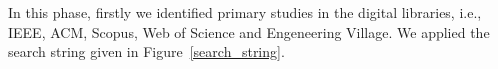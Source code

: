 %

In this phase, firstly we identified primary studies in the digital libraries, i.e., IEEE, ACM, Scopus, Web of Science and Engeneering Village. We applied the search string given in Figure~\ref{search_string}. %



